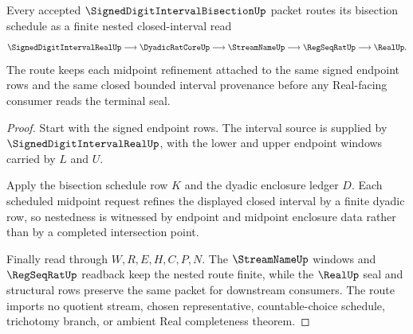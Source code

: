 \begin{theorem}
\label{thm:signed-digit-interval-bisection-nested-interval-route}
Every accepted $\SignedDigitIntervalBisectionUp$ packet routes its bisection schedule as a finite nested closed-interval read
$$
\SignedDigitIntervalRealUp \longrightarrow \DyadicRatCoreUp \longrightarrow \StreamNameUp \longrightarrow \RegSeqRatUp \longrightarrow \RealUp .
$$
The route keeps each midpoint refinement attached to the same signed endpoint rows and the same closed bounded interval provenance before any Real-facing consumer reads the terminal seal.
\end{theorem}
\begin{proof}
Start with the signed endpoint rows. The interval source is supplied by $\SignedDigitIntervalRealUp$, with the lower and upper endpoint windows carried by $L$ and $U$.

Apply the bisection schedule row $K$ and the dyadic enclosure ledger $D$. Each scheduled midpoint request refines the displayed closed interval by a finite dyadic row, so nestedness is witnessed by endpoint and midpoint enclosure data rather than by a completed intersection point.

Finally read through $W,R,E,H,C,P,N$. The $\StreamNameUp$ windows and $\RegSeqRatUp$ readback keep the nested route finite, while the $\RealUp$ seal and structural rows preserve the same packet for downstream consumers. The route imports no quotient stream, chosen representative, countable-choice schedule, trichotomy branch, or ambient Real completeness theorem.
\end{proof}

